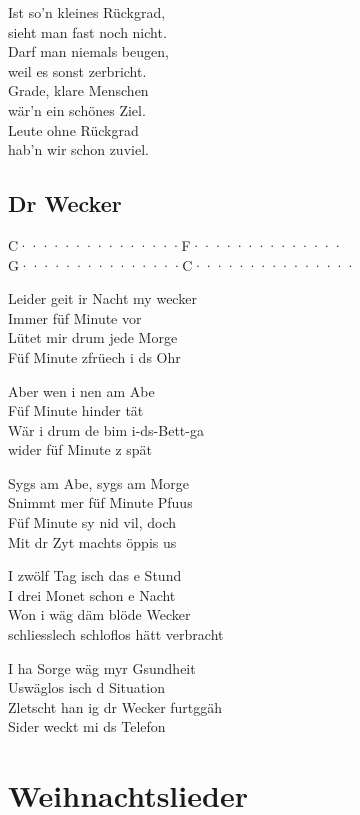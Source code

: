 \documentclass[
  letterpaper,
]{scrbook}
\begin{document}
Ist so'n kleines Rückgrad,\\
sieht man fast noch nicht.\\
Darf man niemals beugen,\\
weil es sonst zerbricht.\\
Grade, klare Menschen\\
wär'n ein schönes Ziel.\\
Leute ohne Rückgrad\\
hab'n wir schon zuviel.

\hypertarget{dr-wecker}{%
\chapter{Dr Wecker}\label{dr-wecker}}

\textbar C·······\textbar········\textbar F······\textbar········\textbar{}\\
\textbar G·······\textbar········\textbar C·······\textbar········\textbar{}

Leider geit ir Nacht my wecker\\
Immer füf Minute vor\\
Lütet mir drum jede Morge\\
Füf Minute z\textquotesingle früech i ds Ohr

Aber wen i nen am Abe\\
Füf Minute hinder tät\\
Wär i drum de bim i-ds-Bett-ga\\
wider füf Minute z spät

Syg\textquotesingle s am Abe, syg\textquotesingle s am Morge\\
S\textquotesingle nimmt mer füf Minute Pfuus\\
Füf Minute sy nid vil, doch\\
Mit dr Zyt macht\textquotesingle s öppis us

I zwölf Tag isch das e Stund\\
I drei Monet schon e Nacht\\
Won i wäg däm blöde Wecker\\
schliesslech schloflos hätt verbracht

I ha Sorge wäg myr Gsundheit\\
Uswäglos isch d Situation\\
Zletscht han ig dr Wecker furtggäh\\
Sider weckt mi ds Telefon

\part{Weihnachtslieder}
\end{document}
